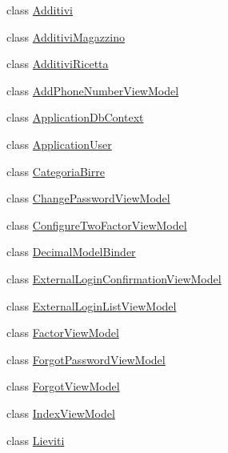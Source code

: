 \begin{DoxyCompactItemize}
\item 
class \mbox{\hyperlink{class_brew_day2_1_1_models_1_1_additivi}{Additivi}}
\item 
class \mbox{\hyperlink{class_brew_day2_1_1_models_1_1_additivi_magazzino}{Additivi\+Magazzino}}
\item 
class \mbox{\hyperlink{class_brew_day2_1_1_models_1_1_additivi_ricetta}{Additivi\+Ricetta}}
\item 
class \mbox{\hyperlink{class_brew_day2_1_1_models_1_1_add_phone_number_view_model}{Add\+Phone\+Number\+View\+Model}}
\item 
class \mbox{\hyperlink{class_brew_day2_1_1_models_1_1_application_db_context}{Application\+Db\+Context}}
\item 
class \mbox{\hyperlink{class_brew_day2_1_1_models_1_1_application_user}{Application\+User}}
\item 
class \mbox{\hyperlink{class_brew_day2_1_1_models_1_1_categoria_birre}{Categoria\+Birre}}
\item 
class \mbox{\hyperlink{class_brew_day2_1_1_models_1_1_change_password_view_model}{Change\+Password\+View\+Model}}
\item 
class \mbox{\hyperlink{class_brew_day2_1_1_models_1_1_configure_two_factor_view_model}{Configure\+Two\+Factor\+View\+Model}}
\item 
class \mbox{\hyperlink{class_brew_day2_1_1_models_1_1_decimal_model_binder}{Decimal\+Model\+Binder}}
\item 
class \mbox{\hyperlink{class_brew_day2_1_1_models_1_1_external_login_confirmation_view_model}{External\+Login\+Confirmation\+View\+Model}}
\item 
class \mbox{\hyperlink{class_brew_day2_1_1_models_1_1_external_login_list_view_model}{External\+Login\+List\+View\+Model}}
\item 
class \mbox{\hyperlink{class_brew_day2_1_1_models_1_1_factor_view_model}{Factor\+View\+Model}}
\item 
class \mbox{\hyperlink{class_brew_day2_1_1_models_1_1_forgot_password_view_model}{Forgot\+Password\+View\+Model}}
\item 
class \mbox{\hyperlink{class_brew_day2_1_1_models_1_1_forgot_view_model}{Forgot\+View\+Model}}
\item 
class \mbox{\hyperlink{class_brew_day2_1_1_models_1_1_index_view_model}{Index\+View\+Model}}
\item 
class \mbox{\hyperlink{class_brew_day2_1_1_models_1_1_lieviti}{Lieviti}}

\end{DoxyCompactItemize}
